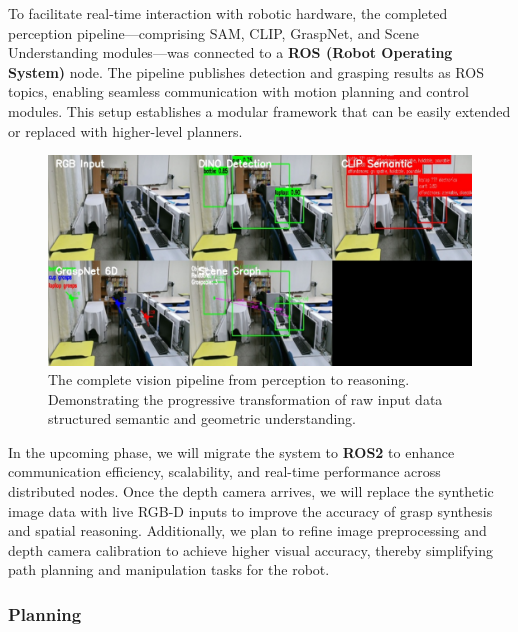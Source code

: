 \documentclass[12pt]{extarticle}
\begin{document}
To facilitate real-time interaction with robotic hardware, the completed perception pipeline—comprising SAM, CLIP, GraspNet, and Scene Understanding modules—was connected to a \textbf{ROS (Robot Operating System)} node. The pipeline publishes detection and grasping results as ROS topics, enabling seamless communication with motion planning and control modules. This setup establishes a modular framework that can be easily extended or replaced with higher-level planners.

\begin{figure}[htbp]
\centering
\includegraphics[width=\linewidth]{images/pipeline_image.png}
\caption{The complete vision pipeline from perception to reasoning. Demonstrating the progressive transformation of raw input data structured semantic and geometric understanding.}
\label{fig: grasp_result}
\end{figure}


In the upcoming phase, we will migrate the system to \textbf{ROS2} to enhance communication efficiency, scalability, and real-time performance across distributed nodes. Once the depth camera arrives, we will replace the synthetic image data with live RGB-D inputs to improve the accuracy of grasp synthesis and spatial reasoning. Additionally, we plan to refine image preprocessing and depth camera calibration to achieve higher visual accuracy, thereby simplifying path planning and manipulation tasks for the robot.


\subsubsection{Planning}
\end{document}
